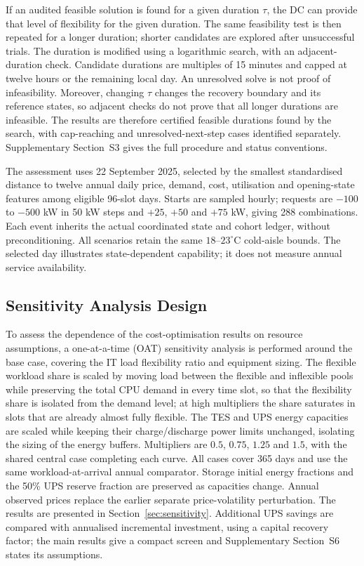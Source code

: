 \documentclass[lettersize,journal]{IEEEtran}
\newcommand{\rev}[1]{#1}
\begin{document}
If an audited feasible solution is found for a given duration $\tau$, the DC can provide that level of flexibility for the given duration. The same feasibility test is then repeated for a longer duration; shorter candidates are explored after unsuccessful trials. The duration is modified using a logarithmic search, with an adjacent-duration check. Candidate durations are multiples of 15 minutes and capped at twelve hours or the remaining local day. An unresolved solve is not proof of infeasibility. Moreover, changing $\tau$ changes the recovery boundary and its reference states, so adjacent checks do not prove that all longer durations are infeasible. The results are therefore certified feasible durations found by the search, with cap-reaching and unresolved-next-step cases identified separately. Supplementary Section~S3 gives the full procedure and status conventions.

The assessment uses 22 September 2025, selected by the smallest standardised distance to twelve annual daily price, demand, cost, utilisation and opening-state features among eligible 96-slot days. Starts are sampled hourly; requests are $-100$ to $-500$ kW in 50 kW steps and $+25$, $+50$ and $+75$ kW, giving 288 combinations. Each event inherits the actual coordinated state and cohort ledger, without preconditioning. All scenarios retain the same $18$--$23^\circ$C cold-aisle bounds. The selected day illustrates state-dependent capability; it does not measure annual service availability.

\subsection{\rev{Sensitivity Analysis Design}}\label{sec:sensitivity-design}
\rev{To assess the dependence of the cost-optimisation results on resource assumptions, a one-at-a-time (OAT) sensitivity analysis is performed around the base case, covering the IT load flexibility ratio and equipment sizing. The flexible workload share is scaled by moving load between the flexible and inflexible pools while preserving the total CPU demand in every time slot, so that the flexibility share is isolated from the demand level; at high multipliers the share saturates in slots that are already almost fully flexible. The TES and UPS energy capacities are scaled while keeping their charge/discharge power limits unchanged, isolating the sizing of the energy buffers. Multipliers are $0.5$, $0.75$, $1.25$ and $1.5$, with the shared central case completing each curve. All cases cover 365 days and use the same workload-at-arrival annual comparator. Storage initial energy fractions and the 50\% UPS reserve fraction are preserved as capacities change. Annual observed prices replace the earlier separate price-volatility perturbation. The results are presented in Section~\ref{sec:sensitivity}.} Additional UPS savings are compared with annualised incremental investment, using a capital recovery factor; the main results give a compact screen and Supplementary Section~S6 states its assumptions.
\end{document}
